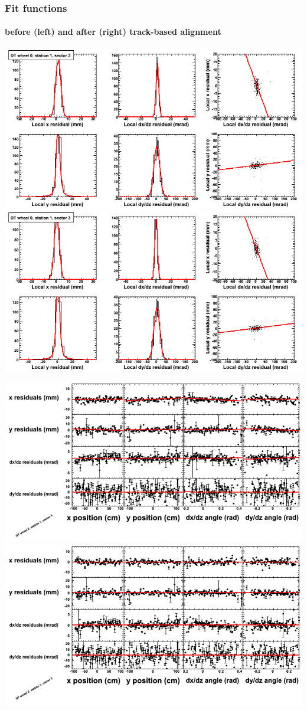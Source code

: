 \documentclass[compress]{beamer}
\begin{document}
\begin{frame}
\frametitle{Fit functions}
\framesubtitle{before (left) and after (right) track-based alignment}
\includegraphics[width=0.5\linewidth]{fitfunctions_re01/MBwhCst1sec03_bellcurves.png} \includegraphics[width=0.5\linewidth]{fitfunctions_re05/MBwhCst1sec03_bellcurves.png}

\includegraphics[width=0.5\linewidth]{fitfunctions_re01/MBwhCst1sec03_polynomials.png} \includegraphics[width=0.5\linewidth]{fitfunctions_re05/MBwhCst1sec03_polynomials.png}
\end{frame}
\end{document}
